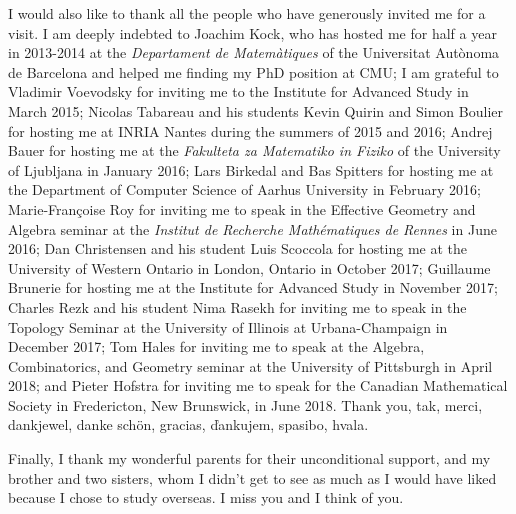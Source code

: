 I would also like to thank all the people who have generously invited me for a visit. I am deeply indebted to Joachim Kock, who has hosted me for half a year in 2013-2014 at the \textit{Departament de Matemàtiques} of the Universitat Autònoma de Barcelona and helped me finding my PhD position at CMU; I am grateful to Vladimir Voevodsky for inviting me to the Institute for Advanced Study in March 2015; Nicolas Tabareau and his students Kevin Quirin and Simon Boulier for hosting me at INRIA Nantes during the summers of 2015 and 2016; Andrej Bauer for hosting me at the \textit{Fakulteta za Matematiko in Fiziko} of the University of Ljubljana in January 2016; Lars Birkedal and Bas Spitters for hosting me at the Department of Computer Science of Aarhus University in February 2016; Marie-Françoise Roy for inviting me to speak in the Effective Geometry and Algebra seminar at the \textit{Institut de Recherche Mathématiques de Rennes} in June 2016; Dan Christensen and his student Luis Scoccola for hosting me at the University of Western Ontario in London, Ontario in October 2017; Guillaume Brunerie for hosting me at the Institute for Advanced Study in November 2017; Charles Rezk and his student Nima Rasekh for inviting me to speak in the Topology Seminar at the University of Illinois at Urbana-Champaign in December 2017; Tom Hales for inviting me to speak at the Algebra, Combinatorics, and Geometry seminar at the University of Pittsburgh in April 2018; and Pieter Hofstra for inviting me to speak for the Canadian Mathematical Society in Fredericton, New Brunswick, in June 2018. Thank you, tak, merci, dankjewel, danke sch\"on, gracias, \v dankujem, spasibo, hvala.

Finally, I thank my wonderful parents for their unconditional support, and my brother and two sisters, whom I didn't get to see as much as I would have liked because I chose to study overseas. I miss you and I think of you.
